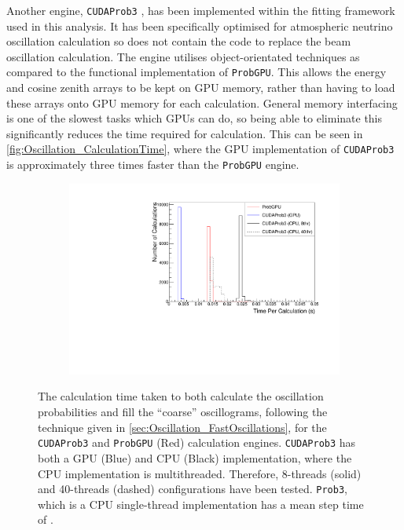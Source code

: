 Another engine, \texttt{CUDAProb3} \cite{cudaprob3}, has been implemented within the fitting framework used in this analysis. It has been specifically optimised for atmospheric neutrino oscillation calculation so does not contain the code to replace the beam oscillation calculation. The engine utilises object-orientated techniques as compared to the functional implementation of \texttt{ProbGPU}. This allows the energy and cosine zenith arrays to be kept on GPU memory, rather than having to load these arrays onto GPU memory for each calculation. General memory interfacing is one of the slowest tasks which GPUs can do, so being able to eliminate this significantly reduces the time required for calculation. This can be seen in \autoref{fig:Oscillation_CalculationTime}, where the GPU implementation of \texttt{CUDAProb3} is approximately three times faster than the \texttt{ProbGPU} engine. 

\begin{figure}[h]
  \begin{subfigure}[t]{0.8\textwidth}
    \includegraphics[width=\textwidth, trim={0mm 0mm 0mm 0mm}, clip,page=1]{Figures/Oscillation/CalculationTime.pdf}
  \end{subfigure}
  \caption{The calculation time taken to both calculate the oscillation probabilities and fill the ``coarse'' oscillograms, following the technique given in \autoref{sec:Oscillation_FastOscillations},  for the \texttt{CUDAProb3} and \texttt{ProbGPU} (Red) calculation engines. \texttt{CUDAProb3} has both a GPU (Blue) and CPU (Black) implementation, where the CPU implementation is multithreaded. Therefore, 8-threads (solid) and 40-threads (dashed) configurations have been tested. \texttt{Prob3}, which is a CPU single-thread implementation has a mean step time of .}
  \label{fig:Oscillation_CalculationTime}
\end{figure}

